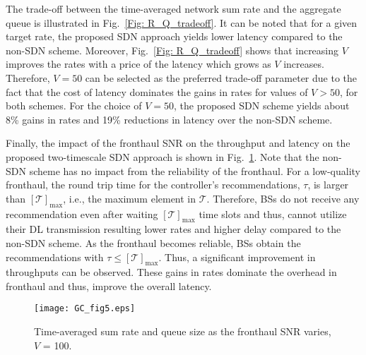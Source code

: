 \documentclass[conference]{IEEEtran}
\begin{document}
The trade-off between the time-averaged network sum rate and the aggregate queue is illustrated in Fig.~\ref{Fig: R_Q_tradeoff}. It can be noted that for a given target rate, the proposed SDN approach yields lower latency compared to the non-SDN scheme. Moreover, Fig.~\ref{Fig: R_Q_tradeoff} shows that increasing $V$ improves the rates with a price of the latency which grows as $V$ increases. Therefore, $V=50$ can be selected as the preferred trade-off parameter due to the fact that the cost of latency dominates the gains in rates for values of $V>50$, for both schemes. For the choice of $V=50$, the proposed SDN scheme yields about 8\% gains in rates and 19\% reductions in latency over the non-SDN scheme.

%
%
%




%
%

Finally, the impact of the fronthaul SNR on the throughput and latency on the proposed two-timescale SDN approach is shown in Fig.~\ref{Fig: SNR_Q}. Note that the non-SDN scheme has no impact from the reliability of the fronthaul.
For a low-quality fronthaul, the round trip time for the controller's recommendations, $\tau$, is larger than $[\mathcal{T}]_{\max}$, i.e., the maximum element in $\mathcal{T}$. Therefore, BSs do not receive any recommendation even after waiting $[\mathcal{T}]_{\max}$  time slots and thus, cannot utilize their DL transmission resulting lower rates and higher delay compared to the non-SDN scheme. As the fronthaul becomes reliable, BSs obtain the recommendations with $\tau\leq [\mathcal{T}]_{\max}$. Thus, a significant improvement in throughputs can be observed. These gains in rates dominate the overhead in fronthaul and thus, improve the overall latency.
\begin{figure}[!t]
	\centering
	\vspace{-1.3em}
	\texttt{[image: GC\_fig5.eps]}
	\vspace{-1.5em}
	\caption{Time-averaged sum rate and queue size as the fronthaul SNR varies, $V$ = 100.}
	\label{Fig: SNR_Q}
	\vspace{-1.5em}
\end{figure}

\end{document}
